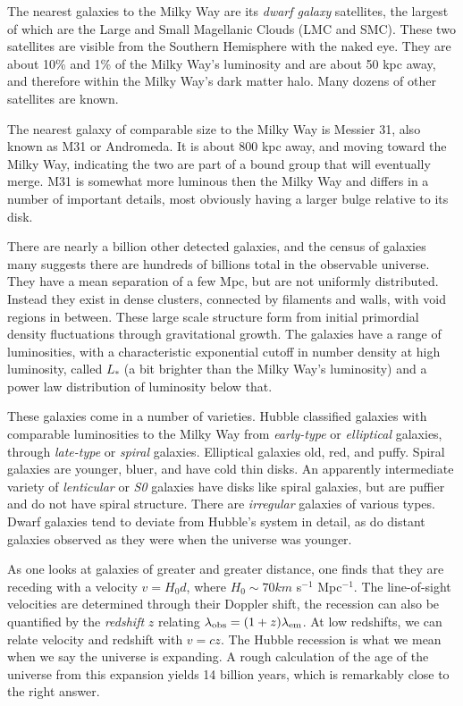 The nearest galaxies to the Milky Way are its {\it dwarf galaxy}
satellites, the largest of which are the Large and Small Magellanic
Clouds (LMC and SMC). These two satellites are visible from the
Southern Hemisphere with the naked eye. They are about 10\% and 1\% of
the Milky Way's luminosity and are about 50 kpc away, and therefore
within the Milky Way's dark matter halo. Many dozens of other
satellites are known.

The nearest galaxy of comparable size to the Milky Way is Messier 31,
also known as M31 or Andromeda. It is about 800 kpc away, and moving
toward the Milky Way, indicating the two are part of a bound group
that will eventually merge. M31 is somewhat more luminous then the
Milky Way and differs in a number of important details, most obviously
having a larger bulge relative to its disk.

There are nearly a billion other detected galaxies, and the census of
galaxies many suggests there are hundreds of billions total in the
observable universe. They have a mean separation of a few Mpc, but are
not uniformly distributed. Instead they exist in dense clusters,
connected by filaments and walls, with void regions in between. These
large scale structure form from initial primordial density
fluctuations through gravitational growth. The galaxies have a range
of luminosities, with a characteristic exponential cutoff in number
density at high luminosity, called $L_\ast$ (a bit brighter than the
Milky Way's luminosity) and a power law distribution of luminosity
below that.

These galaxies come in a number of varieties. Hubble classified
galaxies with comparable luminosities to the Milky Way from {\it
  early-type} or {\it elliptical} galaxies, through {\it late-type} or
{\it spiral} galaxies.  Elliptical galaxies old, red, and
puffy. Spiral galaxies are younger, bluer, and have cold thin
disks. An apparently intermediate variety of {\it lenticular} or {\it
  S0} galaxies have disks like spiral galaxies, but are puffier and do
not have spiral structure. There are {\it irregular} galaxies of
various types. Dwarf galaxies tend to deviate from Hubble's system in
detail, as do distant galaxies observed as they were when the universe
was younger.

As one looks at galaxies of greater and greater distance, one finds
that they are receding with a velocity $v= H_0d$, where $H_0 \sim 70
km$ s$^{-1}$ Mpc$^{-1}$. The line-of-sight velocities are determined
through their Doppler shift, the recession can also be quantified by
the {\it redshift} $z$ relating $\lambda_{\rm obs} = (1+z)
\lambda_{\rm em}$. At low redshifts, we can relate velocity and
redshift with $v=cz$. The Hubble recession is what we mean when we say
the universe is expanding. A rough calculation of the age of the
universe from this expansion yields 14 billion years, which is
remarkably close to the right answer.

